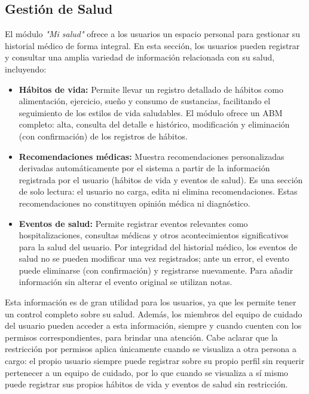\documentclass[a4paper,12pt]{article}
\begin{document}
    \subsection{Gestión de Salud}
    \par El módulo \textit{"Mi salud"} ofrece a los usuarios un espacio personal para gestionar su historial médico de forma integral. En esta sección, los usuarios pueden registrar y consultar una amplia variedad de información relacionada con su salud, incluyendo:
    \begin{itemize}
        \item \textbf{Hábitos de vida:} Permite llevar un registro detallado de hábitos como alimentación, ejercicio, sueño y consumo de sustancias, facilitando el seguimiento de los estilos de vida saludables. El módulo ofrece un ABM completo: alta, consulta del detalle e histórico, modificación y eliminación (con confirmación) de los registros de hábitos.
        \item \textbf{Recomendaciones médicas:} Muestra recomendaciones personalizadas derivadas automáticamente por el sistema a partir de la información registrada por el usuario (hábitos de vida y eventos de salud). Es una sección de solo lectura: el usuario no carga, edita ni elimina recomendaciones. Estas recomendaciones no constituyen opinión médica ni diagnóstico.
        \item \textbf{Eventos de salud:} Permite registrar eventos relevantes como hospitalizaciones, consultas médicas y otros acontecimientos significativos para la salud del usuario. Por integridad del historial médico, los eventos de salud no se pueden modificar una vez registrados; ante un error, el evento puede eliminarse (con confirmación) y registrarse nuevamente. Para añadir información sin alterar el evento original se utilizan notas.
    \end{itemize}
    \par Esta información es de gran utilidad para los usuarios, ya que les permite tener un control completo sobre su salud. Además, los miembros del equipo de cuidado del usuario pueden acceder a esta información, siempre y cuando cuenten con los permisos correspondientes, para brindar una atención. Cabe aclarar que la restricción por permisos aplica únicamente cuando se visualiza a otra persona a cargo: el propio usuario siempre puede registrar sobre su propio perfil sin requerir pertenecer a un equipo de cuidado, por lo que cuando se visualiza a sí mismo puede registrar sus propios hábitos de vida y eventos de salud sin restricción.
\end{document}

